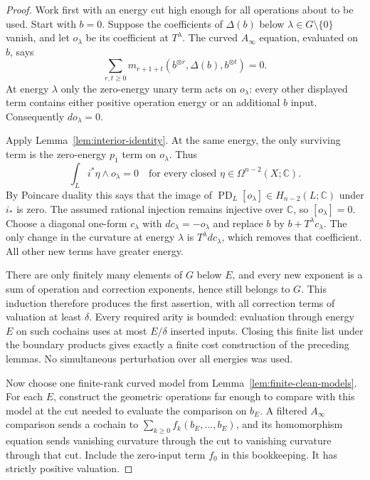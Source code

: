\documentclass[11pt]{article}
\numberwithin{equation}{section}
\theoremstyle{definition}
\theoremstyle{remark}
\newcommand{\C}{\mathbb C}
\begin{document}
\begin{proof}
Work first with an energy cut high enough for all operations about to
be used.  Start with $b=0$.  Suppose the coefficients of $\Delta(b)$
below $\lambda\in G\setminus\{0\}$ vanish, and let $o_\lambda$ be its
coefficient at $T^\lambda$.  The curved $A_\infty$ equation, evaluated
on $b$, says
\[
 \sum_{r,t\geq0}
 m_{r+1+t}(b^{\otimes r},\Delta(b),b^{\otimes t})=0.
\]
At energy $\lambda$ only the zero-energy unary term acts on
$o_\lambda$: every other displayed term contains either positive
operation energy or an additional $b$ input.  Consequently
$d o_\lambda=0$.

Apply Lemma~\ref{lem:interior-identity}.  At the same energy, the only
surviving term is the zero-energy $p_1$ term on $o_\lambda$.  Thus
\begin{equation}
 \label{eq:floer-obstruction-pairing}
 \int_L i^*\eta\wedge o_\lambda=0
 \quad\text{for every closed }\eta\in\Omega^{n-2}(X;\C).
\end{equation}
By Poincare duality this says that the image of
$\operatorname{PD}_L[o_\lambda]\in H_{n-2}(L;\C)$ under $i_*$ is
zero.  The assumed rational injection remains injective over $\C$,
so $[o_\lambda]=0$.  Choose a diagonal one-form $c_\lambda$ with
$dc_\lambda=-o_\lambda$ and replace $b$ by
$b+T^\lambda c_\lambda$.  The only change in the curvature at energy
$\lambda$ is $T^\lambda dc_\lambda$, which removes that coefficient.
All other new terms have greater energy.

There are only finitely many elements of $G$ below $E$, and every
new exponent is a sum of operation and correction exponents, hence
still belongs to $G$.  This induction therefore produces the first
assertion, with all correction terms of valuation at least $\delta$.
Every required arity is bounded: evaluation through energy $E$ on such cochains
uses at most $E/\delta$ inserted inputs.  Closing this finite list
under the boundary products gives exactly a finite cost construction
of the preceding lemmas.  No simultaneous perturbation over all
energies was used.

Now choose one finite-rank curved model from
Lemma~\ref{lem:finite-clean-models}.  For each $E$, construct the
geometric operations far enough to compare with this model at the
cut needed to evaluate the comparison on $b_E$.  A filtered
$A_\infty$ comparison sends a cochain to
$\sum_{k\geq0}f_k(b_E,\ldots,b_E)$, and its homomorphism equation
sends vanishing curvature through the cut to vanishing curvature
through that cut.  Include the zero-input term $f_0$ in this
bookkeeping.  It has strictly positive valuation.


\end{proof}
\end{document}
